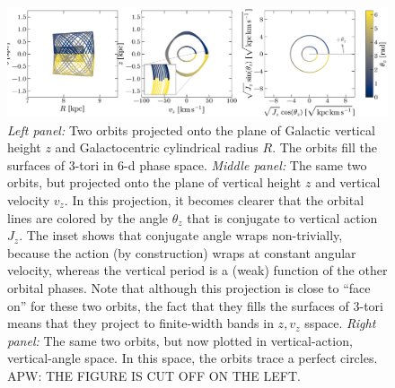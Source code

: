 \documentclass[modern]{aastex63}
\begin{document}
\begin{figure}[!tp]
  \begin{center}
  \includegraphics[width=\textwidth]{zvz-orbit-demo.pdf}
  \end{center}
  \caption{%
    \textsl{Left panel:} Two orbits projected onto the plane of
    Galactic vertical height $z$ and Galactocentric cylindrical radius
    $R$. The orbits fill the surfaces of 3-tori in 6-d phase space.
    \textsl{Middle panel:} The same two orbits, but projected onto the plane
    of vertical height $z$ and vertical velocity $v_z$. In this projection,
    it becomes clearer that the orbital lines are
    colored by the angle $\theta_z$ that is conjugate to vertical action $J_z$.
    The inset shows that conjugate angle wraps non-trivially, because the action
    (by construction) wraps at constant angular velocity, whereas the vertical period
    is a (weak) function of the other orbital phases.
    Note that although this projection is close to ``face on'' for these two
    orbits, the fact that they fills the surfaces of 3-tori means that they
    project to finite-width bands in $z, v_z$ sspace.
    \textsl{Right panel:} The same two orbits, but now plotted in vertical-action,
    vertical-angle space. In this space, the orbits trace a perfect circles.
    APW: THE FIGURE IS CUT OFF ON THE LEFT.
  \label{fig:zvz-demo}
  }
\end{figure}
\end{document}

